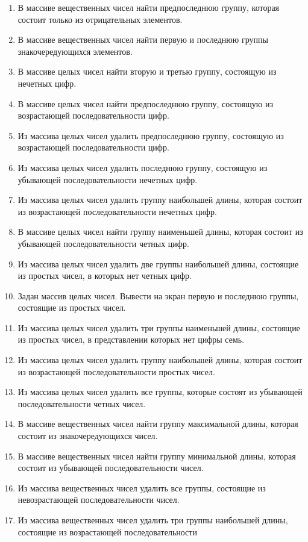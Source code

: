 \begin{enumerate}
\item В массиве вещественных чисел найти предпоследнюю группу, которая состоит только из отрицательных элементов.
\item В массиве вещественных чисел найти первую и последнюю группы знакочередующихся элементов.
\item В массиве целых чисел найти вторую и третью группу, состоящую из нечетных цифр.
\item В массиве целых чисел найти предпоследнюю группу, состоящую из возрастающей последовательности цифр.
\item Из массива целых чисел удалить предпоследнюю группу, состоящую из возрастающей последовательности цифр.
\item Из массива целых чисел удалить последнюю группу, состоящую из убывающей последовательности нечетных цифр.
\item Из массива целых чисел удалить группу наибольшей длины, которая состоит из возрастающей последовательности
нечетных цифр.
\item В массиве целых чисел найти группу наименьшей длины, которая состоит из убывающей последовательности четных цифр.
\item Из массива целых чисел удалить две группы наибольшей длины, состоящие из простых чисел, в которых нет четных цифр.
\item Задан массив целых чисел. Вывести на экран первую и последнюю группы, состоящие из простых чисел.
\item Из массива целых чисел удалить три группы наименьшей длины, состоящие из простых чисел, в представлении которых
нет цифры семь.
\item Из массива целых чисел удалить группу наибольшей длины, которая состоит из возрастающей последовательности простых
чисел.
\item Из массива целых чисел удалить все группы, которые состоят из убывающей последовательности четных чисел.
\item В массиве вещественных чисел найти группу максимальной длины, которая состоит из знакочередующихся чисел.
\item В массиве вещественных чисел найти группу минимальной длины, которая состоит из убывающей последовательности
чисел.
\item Из массива вещественных чисел удалить все группы, состоящие из невозрастающей последовательности чисел.
\item Из массива вещественных чисел удалить три группы наибольшей длины, состоящие из возрастающей последовательности

\end{enumerate}
